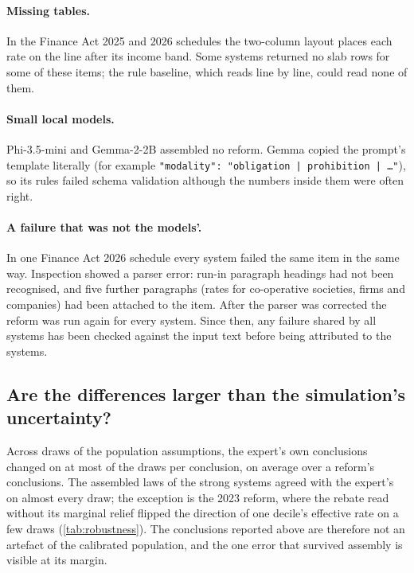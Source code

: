 \documentclass[sn-apa]{sn-jnl}
\begin{document}
\paragraph{Missing tables.} In the Finance Act 2025 and 2026 schedules the
two-column layout places each rate on the line after its income band. Some
systems returned no slab rows for some of these items; the rule baseline,
which reads line by line, could read none of them.

\paragraph{Small local models.} Phi-3.5-mini and Gemma-2-2B assembled no
reform. Gemma copied the prompt's template literally (for example
\texttt{"modality": "obligation | prohibition | \ldots"}), so its rules
failed schema validation although the numbers inside them were often right.

\paragraph{A failure that was not the models'.} In one Finance Act 2026
schedule every system failed the same item in the same way. Inspection
showed a parser error: run-in paragraph headings had not been recognised,
and five further paragraphs (rates for co-operative societies, firms and
companies) had been attached to the item. After the parser was corrected
the reform was run again for every system. Since then, any failure shared
by all systems has been checked against the input text before being
attributed to the systems.

\subsection{Are the differences larger than the simulation's uncertainty?}\label{sec:robustness}


Across  draws of the population assumptions, the expert's own
conclusions changed on at most  of the draws per
conclusion, on average over a reform's conclusions. The assembled laws of
the strong systems agreed with the expert's on almost every draw; the
exception is the 2023 reform, where the rebate read without its marginal
relief flipped the direction of one decile's effective rate on a few draws
(\cref{tab:robustness}). The conclusions reported above are therefore not an
artefact of the calibrated population, and the one error that survived
assembly is visible at its margin.
\end{document}
